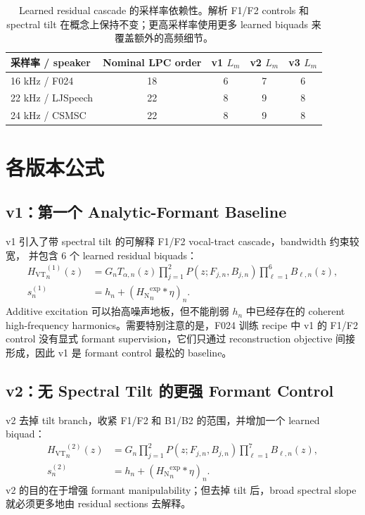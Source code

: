 \documentclass[11pt,fontset=none]{ctexart}
\newcommand{\src}{s}
\newcommand{\harm}{h}
\newcommand{\noise}{\eta}
\newcommand{\vt}{H_{\mathrm{VT}}}
\newcommand{\nfilt}{H_{\mathrm{N}}}
\newcommand{\biquad}{B}
\newcommand{\pole}{P}
\begin{document}
\begin{table}[H]
\centering
\small
\begin{tabular}{@{}lcccc@{}}
\toprule
采样率 / speaker & Nominal LPC order & v1 $L_m$ & v2 $L_m$ & v3 $L_m$ \\
\midrule
16 kHz / F024 & 18 & 6 & 7 & 6 \\
22 kHz / LJSpeech & 22 & 8 & 9 & 8 \\
24 kHz / CSMSC & 22 & 8 & 9 & 8 \\
\bottomrule
\end{tabular}
\caption{Learned residual cascade 的采样率依赖性。解析 F1/F2 controls 和 spectral tilt
在概念上保持不变；更高采样率使用更多 learned biquads 来覆盖额外的高频细节。}
\end{table}

\section{各版本公式}

\subsection{v1：第一个 Analytic-Formant Baseline}

v1 引入了带 spectral tilt 的可解释 F1/F2 vocal-tract cascade，bandwidth 约束较宽，
并包含 6 个 learned residual biquads：
\begin{align}
  {\vt}^{(1)}_n(z)
  &=
  G_n T_{\alpha,n}(z)
  \prod_{j=1}^{2}\pole(z;F_{j,n},B_{j,n})
  \prod_{\ell=1}^{6}\biquad_{\ell,n}(z),\\
  \src^{(1)}_n
  &=
  \harm_n + ({\nfilt}^{\exp}_n * \noise)_n.
\end{align}
Additive excitation 可以抬高噪声地板，但不能削弱 $\harm_n$ 中已经存在的 coherent
high-frequency harmonics。需要特别注意的是，F024 训练 recipe 中 v1 的 F1/F2 control
没有显式 formant supervision，它们只通过 reconstruction objective 间接形成，因此 v1
是 formant control 最松的 baseline。

\subsection{v2：无 Spectral Tilt 的更强 Formant Control}

v2 去掉 tilt branch，收紧 F1/F2 和 B1/B2 的范围，并增加一个 learned biquad：
\begin{align}
  {\vt}^{(2)}_n(z)
  &=
  G_n
  \prod_{j=1}^{2}\pole(z;F_{j,n},B_{j,n})
  \prod_{\ell=1}^{7}\biquad_{\ell,n}(z),\\
  \src^{(2)}_n
  &=
  \harm_n + ({\nfilt}^{\exp}_n * \noise)_n.
\end{align}
v2 的目的在于增强 formant manipulability；但去掉 tilt 后，broad spectral slope
就必须更多地由 residual sections 去解释。
\end{document}
